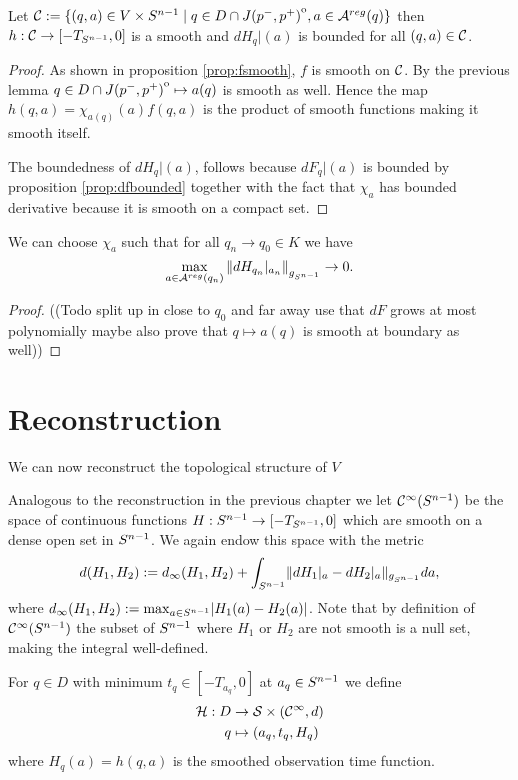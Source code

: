\begin{corollary}\label{cor:hsmooth}
    Let ${\mathcal{C}}:=\{(q,a)\in V\times {S^{n-1}} \mid q \in D\cap {\kern0ptJ(p^-,p^+)}^{\mathrm{o}}, a\in {{\mathcal{A}}^{reg}}(q)\}$ then $h:{\mathcal{C}}\to [-T_{S^{n-1}},0]$ is a smooth and $dH_q\rvert(a)$ is bounded for all $(q,a)\in {\mathcal{C}}$.
\end{corollary}
\begin{proof}
    As shown in proposition \ref{prop:fsmooth}, $f$ is smooth on ${\mathcal{C}}$. By the previous lemma $q\in D\cap {\kern0ptJ(p^-,p^+)}^{\mathrm{o}}\mapsto a(q)$ is smooth as well.
    Hence the map $h(q,a) = \chi_{a(q)}(a)f(q,a)$ is the product of smooth functions making it smooth itself.

    The boundedness of $dH_q\rvert(a)$, follows because $dF_q\rvert(a)$ is bounded by proposition \ref{prop:dfbounded} together with the fact that $\chi_{a}$ has bounded derivative because it is smooth on a compact set.
\end{proof}

\begin{lemma}\label{lem:dhconvonboundary}
    We can choose $\chi_a$ such that for all $q_n \to q_0\in K$ we have
    \[
        \max_{a\in {{\mathcal{A}}^{reg}}(q_n)} \left\lVert dH_{q_n}\rvert_{a_n}\right\rVert_{g_{S^{n-1}}}\to 0.
    \]
\end{lemma}
\begin{proof}
    ((Todo split up in close to $q_0$ and far away use that $dF$ grows at most polynomially maybe also prove that $q\mapsto a(q)$ is smooth at boundary as well))
\end{proof}

\section{Reconstruction}
We can now reconstruct the topological structure of $V$

Analogous to the reconstruction in the previous chapter we let ${\mathcal{C}}^{\infty}({S^{n-1}})$ be the space of continuous functions $H:{S^{n-1}} \to [-T_{S^{n-1}},0]$ which are smooth on a dense open set in ${S^{n-1}}$. We again endow this space with the metric 
\[
    d(H_1,H_2):= d_\infty(H_1,H_2) + \int_{{S^{n-1}}} \lVert dH_1\rvert_a - dH_2\rvert_a \rVert_{g_{S^{n-1}}}da,
\] where $d_\infty(H_1,H_2):=\max_{a\in {S^{n-1}}}\lvert H_1(a)-H_2(a)\rvert$.
Note that by definition of ${\mathcal{C}}^\infty({S^{n-1}})$ the subset of ${S^{n-1}}$ where $H_1$ or $H_2$ are not smooth is a null set, making the integral well-defined.

For $q\in D$ with minimum $t_q\in [-T_{a_q},0]$ at $a_q\in {S^{n-1}}$ we define
\begin{align*}
    \mathcal{H}:D &\to {\mathcal{S}}\times({\mathcal{C}}^\infty, d)\\
    q&\mapsto (a_q,t_q, H_q)
\end{align*} where $H_q(a)=h(q,a)$ is the smoothed observation time function.

